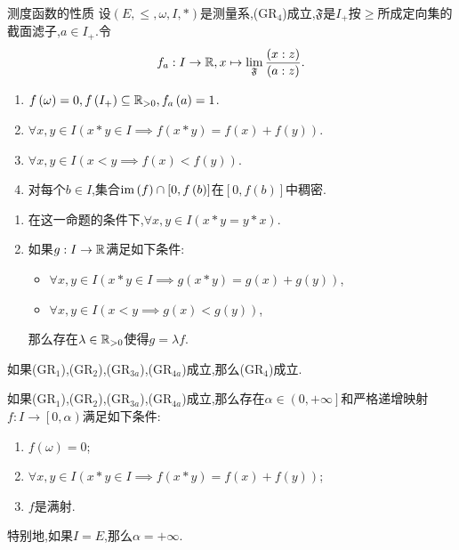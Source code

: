 \begin{proposition}{测度函数的性质}{}
	设$\left(E,\leq,\omega,I,\ast\right)$是测量系,($\mathrm{GR}_{4}$)成立,$\mathfrak{F}$是$I_{+}$按$\geq$所成定向集的截面滤子,$a\in I_{+}$.令
	\begin{align*}
		f_{a}:I\to\mathbb{R},x\mapsto\displaystyle\lim_{\mathfrak{F}}\frac{\left(x:z\right)}{\left(a:z\right)}.
	\end{align*}
	\begin{enumerate}
		\item $f\left(\omega\right)=0,f\left(I_{+}\right)\subseteq\mathbb{R}_{>0},f_{a}\left(a\right)=1$.
		\item $\forall x,y\in I\left(x\ast y\in I\implies f\left(x\ast y\right)=f\left(x\right)+f\left(y\right)\right)$.
		\item $\forall x,y\in I\left(x<y\implies f\left(x\right)<f\left(y\right)\right)$.
		\item 对每个$b\in I$,集合$\operatorname{im}\left(f\right)\cap\left[0,f\left(b\right)\right]$在$\left[0,f\left(b\right)\right]$中稠密.
	\end{enumerate}
\end{proposition}

\begin{remark}{}{}
	\begin{enumerate}
		\item 在这一命题的条件下,$\forall x,y\in I\left(x\ast y=y\ast x\right)$.
		\item 如果$g:I\to\mathbb{R}$满足如下条件:
		\begin{itemize}
			\item $\forall x,y\in I\left(x\ast y\in I\implies g\left(x\ast y\right)=g\left(x\right)+g\left(y\right)\right)$,
			\item $\forall x,y\in I\left(x<y\implies g\left(x\right)<g\left(y\right)\right)$,
		\end{itemize}
		那么存在$\lambda\in\mathbb{R}_{>0}$使得$g=\lambda f$.
	\end{enumerate}
\end{remark}

\begin{proposition}{}{}
	如果($\mathrm{GR}_{1}$),($\mathrm{GR}_{2}$),($\mathrm{GR}_{3a}$),($\mathrm{GR}_{4a}$)成立,那么($\mathrm{GR}_{4}$)成立.
\end{proposition}

\begin{proposition}{}{}
	如果($\mathrm{GR}_{1}$),($\mathrm{GR}_{2}$),($\mathrm{GR}_{3a}$),($\mathrm{GR}_{4a}$)成立,那么存在$\alpha\in\left(0,+\infty\right]$和严格递增映射$f:I\to\left[0,\alpha\right)$满足如下条件:
	\begin{enumerate}
		\item $f\left(\omega\right)=0$;
		\item $\forall x,y\in I\left(x\ast y\in I\implies f\left(x\ast y\right)=f\left(x\right)+f\left(y\right)\right)$;
		\item $f$是满射.
	\end{enumerate}
	特别地,如果$I=E$,那么$\alpha=+\infty$.
\end{proposition}